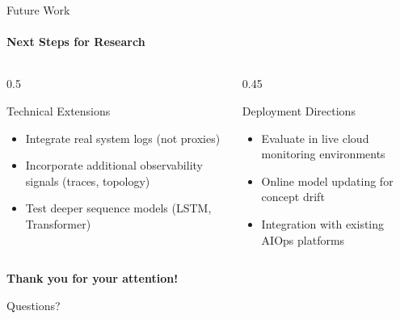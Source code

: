 \documentclass[aspectratio=169,11pt]{beamer}
\begin{document}
\begin{frame}{Future Work}
\framesubtitle{Next Steps for Research}

\begin{columns}
\begin{column}{0.5\textwidth}
\begin{block}{Technical Extensions}
\begin{itemize}
    \item Integrate real system logs (not proxies)
    \item Incorporate additional observability signals (traces, topology)
    \item Test deeper sequence models (LSTM, Transformer)
\end{itemize}
\end{block}
\end{column}

\begin{column}{0.45\textwidth}
\begin{block}{Deployment Directions}
\begin{itemize}
    \item Evaluate in live cloud monitoring environments
    \item Online model updating for concept drift
    \item Integration with existing AIOps platforms
\end{itemize}
\end{block}
\end{column}
\end{columns}
\end{frame}

\begin{frame}

\begin{center}
\begin{block}{}
\centering
\textbf{Thank you for your attention!}
\end{block}

\vspace{0.3em}
{\normalsize Questions?}
\end{center}
\end{frame}

\end{document}
